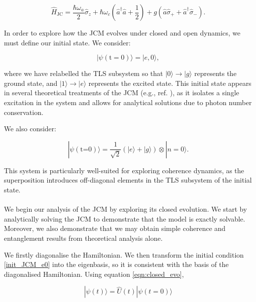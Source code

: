 \documentclass[12pt]{article}
\begin{document}
\begin{equation*}
    \hat{H}_{\scriptscriptstyle \text{JC}} = \frac{\hbar\omega_a}{2}\hat{\sigma}_z + \hbar\omega_c\left(\hat{a}^\dagger \hat{a} + \frac{1}{2} \right) + g(\hat{a}\hat{\sigma}_{+} + \hat{a}^\dagger\hat{\sigma}_{-}). 
\end{equation*} 

In order to explore how the JCM evolves under closed and open dynamics, we must define our initial state. We consider:

\begin{equation} \label{init_JCM_e0}
    |\psi (\text{t}=0)\rangle = |e, 0\rangle,
\end{equation}

where we have relabelled the TLS subsystem so that $|0\rangle \rightarrow|g\rangle$ represents the ground state, and $|1\rangle \rightarrow |e\rangle$ represents the excited state. This initial state appears in several theoretical treatments of the JCM (e.g., ref. \cite{Entanglement2009-REE_VNapplied}), as it isolates a single excitation in the system and allows for analytical solutions due to photon number conservation.

We also consider:

\begin{equation} \label{init_JCM_e0g0}
    |\psi (\text{t=0})\rangle = \frac{1}{\sqrt{2}}(|e\rangle + |g\rangle)\otimes|n=0\rangle.
\end{equation}

This system is particularly well-suited for exploring coherence dynamics, as the superposition introduces off-diagonal elements in the TLS subsystem of the initial state.\\
\\
We begin our analysis of the JCM by exploring its closed evolution. We start by analytically solving the JCM to demonstrate that the model is exactly solvable. Moreover, we also demonstrate that we may obtain simple coherence and entanglement results from theoretical analysis alone. 

We firstly diagonalise the Hamiltonian. We then transform the initial condition \eqref{init_JCM_e0} into the eigenbasis, so it is consistent with the basis of the diagonalised Hamiltonian. Using equation \eqref{eqn:closed_evo},

\begin{equation*} 
    |\psi(t)\rangle = \hat{U}(t)|\psi(t=0)\rangle
\end{equation*}
\end{document}
